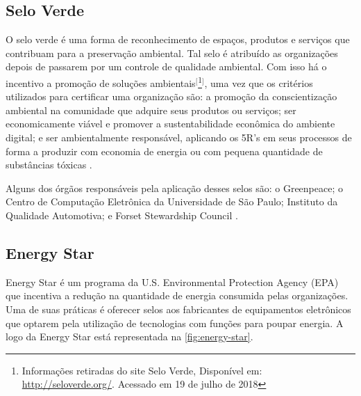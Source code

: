 \subsection{Selo Verde}

O selo verde é uma forma de reconhecimento de espaços, produtos e serviços que contribuam para a preservação ambiental. Tal selo é atribuído as organizações depois de passarem por um controle de qualidade ambiental. Com isso há o incentivo a promoção de soluções ambientais$^{[}$\footnote{Informações retiradas do site Selo Verde, Disponível em: \url{http://seloverde.org/}.  Acessado em 19 de julho de 2018}$^{]}$, uma vez que os critérios utilizados para certificar uma organização são:  a promoção da conscientização ambiental na comunidade que adquire seus produtos ou serviços; ser economicamente viável e promover a sustentabilidade econômica do ambiente digital; e ser ambientalmente responsável, aplicando os 5R’s em seus processos de forma a produzir com economia de energia ou com pequena quantidade de substâncias tóxicas \cite{abreu2012ti}.

Alguns dos órgãos responsáveis pela aplicação desses selos são: o Greenpeace; o Centro de Computação Eletrônica da Universidade de São Paulo; Instituto da Qualidade Automotiva; e Forset Stewardship Council \cite{pinto2011estudo}.

\subsection{Energy Star}

Energy Star é um programa da U.S. Environmental Protection Agency (EPA) que incentiva a redução na quantidade de energia consumida pelas organizações. Uma de suas práticas é oferecer selos aos fabricantes de equipamentos eletrônicos que optarem pela utilização de tecnologias com funções para poupar energia. A logo da Energy Star está representada na \autoref{fig:energy-star}. 

